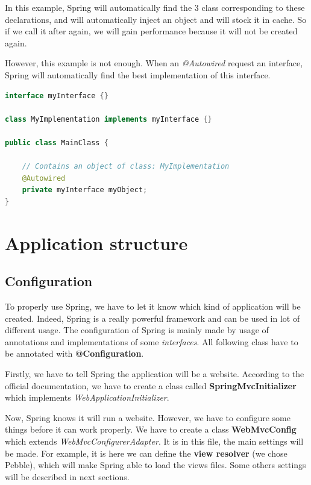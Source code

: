 In this example, Spring will automatically find the 3 class corresponding to these declarations, and will automatically inject an object and will stock it in cache. So if we call it after again, we will gain performance because it will not be created again.\newline

However, this example is not enough. When an \textit{@Autowired} request an interface, Spring will automatically find the best implementation of this interface.
 
\begin{lstlisting}[language=java,caption={JAVA}]
interface myInterface {}

class MyImplementation implements myInterface {}

public class MainClass {

	// Contains an object of class: MyImplementation
	@Autowired
	private myInterface myObject; 
}
\end{lstlisting}




\section{Application structure}

\subsection{Configuration}
To properly use Spring, we have to let it know which kind of application will be created. Indeed, Spring is a really powerful framework and can be used in lot of different usage.
The configuration of Spring is mainly made by usage of annotations and implementations of some \textit{interfaces}. All following class have to be annotated with \textbf{@Configuration}.\newline

Firstly, we have to tell Spring the application will be a website. According to the official documentation, we have to create a class called \textbf{SpringMvcInitializer} which implements \textit{WebApplicationInitializer}.\newline

Now, Spring knows it will run a website. However, we have to configure some things before it can work properly. We have to create a class \textbf{WebMvcConfig} which extends \textit{WebMvcConfigurerAdapter}. It is in this file, the main settings will be made. For example, it is here we can define the \textbf{view resolver} (we chose Pebble), which will make Spring able to load the views files.  Some others settings will be described in next sections.
\newline


